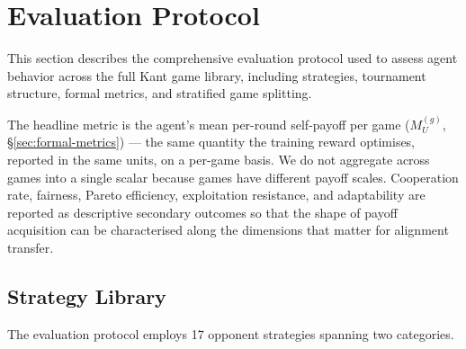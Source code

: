 
\section{Evaluation Protocol}
\label{sec:eval-protocol}

This section describes the comprehensive evaluation protocol used to assess
agent behavior across the full Kant game library, including strategies,
tournament structure, formal metrics, and stratified game splitting.

The headline metric is the agent's mean per-round self-payoff per game
($M_U^{(g)}$, \S\ref{sec:formal-metrics}) --- the same quantity the
training reward optimises, reported in the same units, on a per-game
basis. We do not aggregate across games into a single scalar because
games have different payoff scales. Cooperation rate, fairness, Pareto
efficiency, exploitation resistance, and adaptability are reported as
descriptive secondary outcomes so that the shape of payoff acquisition
can be characterised along the dimensions that matter for alignment
transfer.

\subsection{Strategy Library}
\label{sec:strategy-library}

The evaluation protocol employs 17 opponent strategies spanning two categories.

